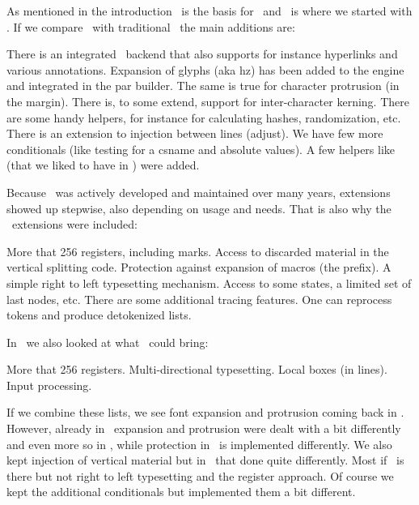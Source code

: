 As mentioned in the introduction \PDFTEX\ is the basis for \LUATEX\ and \LUATEX\ is
where we started with \LUAMETATEX. If we compare \PDFTEX\ with traditional \TEX\
the main additions are:

\startitemize[packed]
\startitem
    There is an integrated \PDF\ backend that also supports for instance hyperlinks and
    various annotations.
\stopitem
\startitem
    Expansion of glyphs (aka hz) has been added to the engine and integrated in the
    par builder. The same is true for character protrusion (in the margin).
\stopitem
\startitem
    There is, to some extend, support for inter-character kerning.
\stopitem
\startitem
    There are some handy helpers, for instance for calculating hashes,
    randomization, etc.
\stopitem
\startitem
    There is an extension to injection between lines (adjust).
\stopitem
\startitem
    We have few more conditionals (like testing for a csname and absolute values).
\stopitem
\startitem
    A few helpers like \type {\quitvmode} (that we liked to have in \CONTEXT)
    were added.
\stopitem
\stopitemize

Because \PDFTEX\ was actively developed and maintained over many years,
extensions showed up stepwise, also depending on usage and needs. That is also
why the \ETEX\ extensions were included:

\startitemize[packed]
\startitem
    More that 256 registers, including marks.
\stopitem
\startitem
    Access to discarded material in the vertical splitting code.
\stopitem
\startitem
    Protection against expansion of macros (the \type {\protected} prefix).
\stopitem
\startitem
    A simple right to left typesetting mechanism.
\stopitem
\startitem
    Access to some states, a limited set of last nodes, etc.
\stopitem
\startitem
    There are some additional tracing features.
\stopitem
\startitem
    One can reprocess tokens and produce detokenized lists.
\stopitem
\stopitemize

In \LUATEX\ we also looked at what \OMEGA\ could bring:

\startitemize[packed]
\startitem
    More that 256 registers.
\stopitem
\startitem
    Multi-directional typesetting.
\stopitem
\startitem
    Local boxes (in lines).
\stopitem
\startitem
    Input processing.
\stopitem
\stopitemize

If we combine these lists, we see font expansion and protrusion coming back in
\LUAMETATEX. However, already in \LUATEX\ expansion and protrusion were dealt
with a bit differently and even more so in \LUAMETATEX, while protection in
\LUAMETATEX\ is implemented differently. We also kept injection of vertical
material but in \LUAMETATEX\ that done quite differently. Most if \ETEX\ is there
but not right to left typesetting and the register approach. Of course we kept
the additional conditionals but implemented them a bit different.

